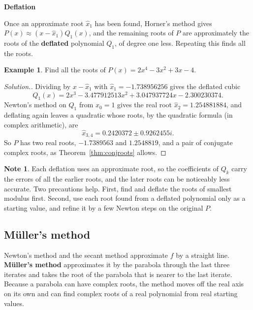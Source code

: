 \documentclass[11pt,a4paper]{article}
\numberwithin{equation}{section}
\theoremstyle{definition}
\newtheorem{exa}[thm]{Example}
\newtheorem*{note}{Note}
\newenvironment{solution}
  {\renewcommand{\qedsymbol}{}\begin{proof}[\textit{Solution}.]}
  {\end{proof}}
\newcommand{\subhead}[1]{%
  \par\medskip\noindent\textbf{#1}\par\nobreak\smallskip}
\begin{document}
\subhead{Deflation}
Once an approximate root $\hat x_1$ has been found, Horner's method gives $P(x)\approx(x-\hat x_1)Q_1(x)$, and the remaining roots of $P$ are
approximately the roots of the \textbf{deflated} polynomial $Q_1$, of degree one less. Repeating this finds all the roots.

\begin{exa}
\label{exa:deflation}
Find all the roots of $P(x) = 2x^4-3x^2+3x-4$.
\end{exa}

\begin{solution}
Dividing by $x-\hat x_1$ with $\hat x_1 = -1.738956256$ gives the deflated cubic
$$Q_1(x) = 2x^3-3.477912513x^2+3.047937724x-2.300230374 .$$
Newton's method on $Q_1$ from $x_0 = 1$ gives the real root $\hat x_2 = 1.254881884$, and deflating again leaves a quadratic whose roots,
by the quadratic formula (in complex arithmetic), are
$$\hat x_{3,4} = 0.2420372\pm0.9262455i .$$
So $P$ has two real roots, $-1.7389563$ and $1.2548819$, and a pair of conjugate complex roots, as Theorem~\ref{thm:conjroots} allows.
\end{solution}

\begin{note}
Each deflation uses an approximate root, so the coefficients of $Q_k$ carry the errors of all the earlier roots, and the later roots
can be noticeably less accurate. Two precautions help. First, find and deflate the roots of smallest modulus first. Second, use each
root found from a deflated polynomial only as a starting value, and refine it by a few Newton steps on the original $P$.
\end{note}


\subsection{M\"uller's method}
\label{sec:muller}

Newton's method and the secant method approximate $f$ by a straight line. \textbf{M\"uller's method} approximates it by the parabola through
the last three iterates and takes the root of the parabola that is nearer to the last iterate. Because a parabola can have complex roots,
the method moves off the real axis on its own and can find complex roots of a real polynomial from real starting values.
\end{document}
